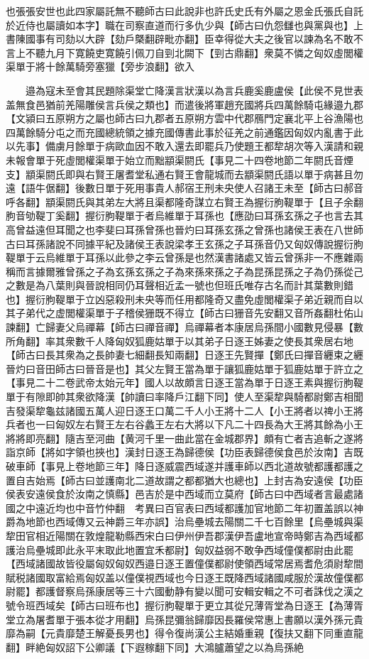 也張張安世也此四家屬託無不聽師古曰此說非也許氏史氏有外屬之恩金氏張氏自託於近侍也屬讀如本字】職在司察直道而行多仇少與【師古曰仇怨讎也與黨與也】上書陳國事有司劾以大辟【劾戶槩翻辟毗亦翻】臣幸得從大夫之後官以諫為名不敢不言上不聽九月下寛饒吏寛饒引佩刀自剄北闕下【剄古鼎翻】衆莫不憐之匈奴虛閭權渠單于將十餘萬騎旁塞獵【旁步浪翻】欲入

　　邉為寇未至會其民題除渠堂亡降漢言狀漢以為言兵鹿奚鹿盧侯【此侯不見世表盖無食邑猶前羌陽雕侯言兵侯之類也】而遣後將軍趙充國將兵四萬餘騎屯緣邉九郡【文潁曰五原朔方之屬也師古曰九郡者五原朔方雲中代郡鴈門定襄北平上谷漁陽也四萬餘騎分屯之而充國總統領之據充國傳書此事於征羌之前通鑑因匈奴内亂書于此以先事】備虜月餘單于病歐血因不敢入還去即罷兵乃使題王都犂胡次等入漢請和親未報會單于死虛閭權渠單于始立而黜顓渠閼氏【事見二十四卷地節二年閼氏音煙支】顓渠閼氏即與右賢王屠耆堂私通右賢王會龍城而去顓渠閼氏語以單于病甚且勿遠【語牛倨翻】後數日單于死用事貴人郝宿王刑未央使人召諸王未至【師古曰郝音呼各翻】顓渠閼氏與其弟左大將且渠都隆奇謀立右賢王為握衍朐鞮單于【且子余翻朐音劬鞮丁奚翻】握衍朐鞮單于者烏維單于耳孫也【應劭曰耳孫玄孫之子也言去其高曾益遠但耳聞之也李斐曰耳孫曾孫也晉灼曰耳孫玄孫之曾孫也諸侯王表在八世師古曰耳孫諸說不同據平紀及諸侯王表說梁孝王玄孫之子耳孫音仍又匈奴傳說握衍朐鞮單于云烏維單于耳孫以此參之李云曾孫是也然漢書諸處又皆云曾孫非一不應雜兩稱而言據爾雅曾孫之子為玄孫玄孫之子為來孫來孫之子為昆孫昆孫之子為仍孫從己之數是為八葉則與晉說相同仍耳聲相近孟一號也但班氏唯存古名而計其葉數則錯也】握衍朐鞮單于立凶惡殺刑未央等而任用都隆奇又盡免虛閭權渠子弟近親而自以其子弟代之虚閭權渠單于子稽侯㹪既不得立【師古曰㹪音先安翻又音所姦翻杜佑山諫翻】亡歸妻父烏禪幕【師古曰禪音禪】烏禪幕者本康居烏孫間小國數見侵暴【數所角翻】率其衆數千人降匈奴狐鹿姑單于以其弟子日逐王姊妻之使長其衆居右地【師古曰長其衆為之長帥妻七細翻長知兩翻】日逐王先賢撣【鄭氏曰撣音纒束之纒晉灼曰音田師古曰晉音是也】其父左賢王當為單于讓狐鹿姑單于狐鹿姑單于許立之【事見二十二卷武帝太始元年】國人以故頗言日逐王當為單于日逐王素與握衍朐鞮單于有隙即帥其衆欲降漢【帥讀曰率降戶江翻下同】使人至渠犂與騎都尉鄭吉相聞吉發渠犂龜兹諸國五萬人迎日逐王口萬二千人小王將十二人【小王將者以禆小王將兵者也一曰匈奴左右賢王左右谷蠡王左右大將以下凡二十四長為大王將其餘為小王將將即亮翻】隨吉至河曲【黄河千里一曲此當在金城郡界】頗有亡者吉追斬之遂將詣京師【將如字領也挾也】漢封日逐王為歸德侯【功臣表歸德侯食邑於汝南】吉既破車師【事見上卷地節三年】降日逐威震西域遂并護車師以西北道故號都護都護之置自吉始焉【師古曰並護南北二道故謂之都都猶大也總也】上封吉為安遠侯【功臣侯表安遠侯食於汝南之慎縣】邑吉於是中西域而立莫府【師古曰中西域者言最處諸國之中遠近均也中音竹仲翻　考異曰百官表曰西域都護加官地節二年初置盖誤以神爵為地節也西域傳又云神爵三年亦誤】治烏壘城去陽關二千七百餘里【烏壘城與渠犂田官相近陽關在敦煌龍勒縣西宋白曰伊州伊吾郡漢伊吾盧地宣帝時鄭吉為西域都護治烏壘城即此永平末取此地置宜禾都尉】匈奴益弱不敢争西域僮僕都尉由此罷【西域諸國故皆役屬匈奴匈奴西邉日逐王置僮僕都尉使領西域常居焉耆危須尉犂間賦税諸國取富給焉匈奴盖以僮僕視西域也今日逐王既降西域諸國咸服於漢故僮僕都尉罷】都護督察烏孫康居等三十六國動静有變以聞可安輯安輯之不可者誅伐之漢之號令班西域矣【師古曰班布也】握衍朐鞮單于更立其從兄薄胥堂為日逐王【為薄胥堂立為屠耆單于張本從才用翻】烏孫昆彌翁歸靡因長羅侯常惠上書願以漢外孫元貴靡為嗣【元貴靡楚王解憂長男也】得令復尚漢公主結婚重親【復扶又翻下同重直龍翻】畔絶匈奴詔下公卿議【下遐稼翻下同】大鴻臚蕭望之以為烏孫絶